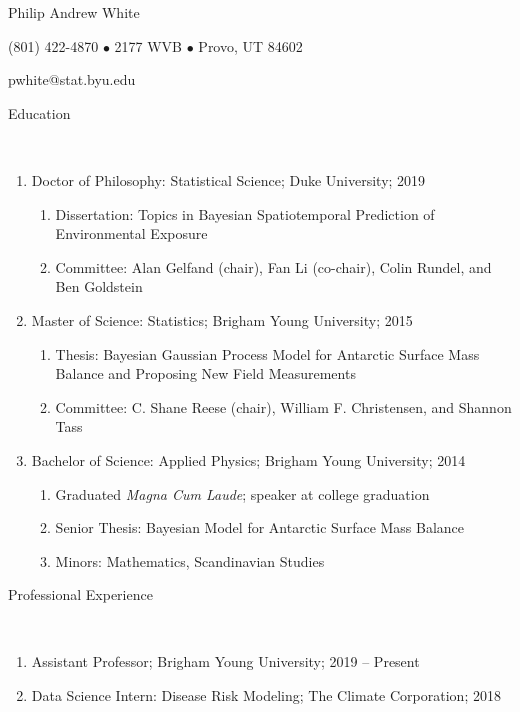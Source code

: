 \documentclass[11pt]{article}
\newcommand{\head}[1]{ %
    \bigskip %
    \begin{large}\begin{bf}{#1}\end{bf}\end{large} %

    \ \\ [-1.3cm] %

    \hrulefill}
\begin{document}

\centerline{ \LARGE Philip Andrew White }
\smallskip
\centerline{ (801) 422-4870 $\bullet$ 2177 WVB $\bullet$ Provo, UT 84602 }
\smallskip
\centerline{pwhite@stat.byu.edu }
\smallskip


\head{Education}

\begin{enumerate}[label=$\bullet$]
\item Doctor of Philosophy: Statistical Science; Duke University; 2019
\begin{enumerate}[label=$\cdot$]
\item Dissertation: Topics in Bayesian Spatiotemporal Prediction of Environmental Exposure
\item Committee: Alan Gelfand (chair), Fan Li (co-chair), Colin Rundel, and Ben Goldstein
\end{enumerate}

\item Master of Science: Statistics; Brigham Young University; 2015

\begin{enumerate}[label=$\cdot$]
\item Thesis: Bayesian Gaussian Process Model for Antarctic Surface Mass Balance and Proposing New Field Measurements
\item  Committee: C. Shane Reese (chair), William F. Christensen, and Shannon Tass
\end{enumerate}

\item Bachelor of Science: Applied Physics; Brigham Young University; 2014 

\begin{enumerate}[label=$\cdot$]
\item Graduated \emph{Magna Cum Laude}; speaker at college graduation
\item Senior Thesis: Bayesian Model for Antarctic Surface Mass Balance
\item Minors: Mathematics, Scandinavian Studies
\end{enumerate}
\end{enumerate}


\head{Professional Experience}

\begin{enumerate}[label=$\bullet$]

\item Assistant Professor; Brigham Young University; 2019 -- Present

\item Data Science Intern: Disease Risk Modeling; The Climate Corporation; 2018

\end{enumerate}
\end{document}
